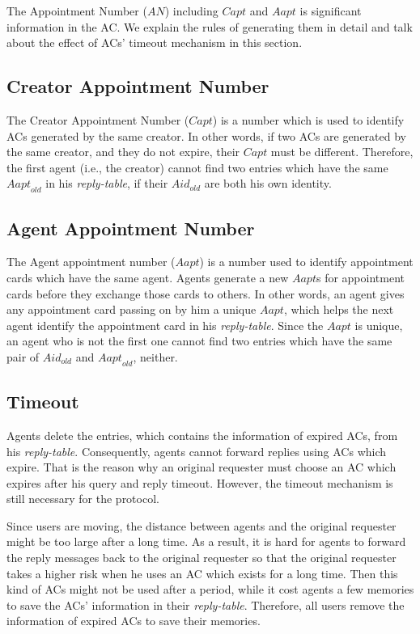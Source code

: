\documentclass[conference]{IEEEtran}
\begin{document}
\noindent The Appointment Number ($AN$) including $Capt$ and $Aapt$ is significant information in the AC. We explain the rules of generating them in detail and talk about the effect of ACs' timeout mechanism in this section.


\subsection{  Creator Appointment Number}

\noindent The Creator Appointment Number ($Capt$) is a number which is used to identify ACs generated by the same creator. In other words, if two ACs are generated by the same creator, and they do not expire, their $Capt$ must be different. Therefore, the first agent (i.e., the creator) cannot find two entries which have the same ${Aapt}_{old}$ in his \textit{reply-table}, if their ${Aid}_{old}$ are both his own identity.


\subsection{ Agent Appointment Number}

\noindent The Agent appointment number ($Aapt$) is a number used to identify appointment cards which have the same agent. Agents generate a new $Aapt$s for appointment cards before they exchange those cards to others. In other words, an agent gives any appointment card passing on by him a unique $Aapt$, which helps the next agent identify the appointment card in his \textit{reply-table}. Since the $Aapt$ is unique, an agent who is not the first one cannot find two entries which have the same pair of ${Aid}_{old}$ and ${Aapt}_{old}$, neither.


\subsection{ Timeout}

\noindent Agents delete the entries, which contains the information of expired ACs, from his \textit{reply-table}. Consequently, agents cannot forward replies using ACs which expire. That is the reason why an original requester must choose an AC which expires after his query and reply timeout. However, the timeout mechanism is still necessary for the protocol.

Since users are moving, the distance between agents and the original requester might be too large after a long time. As a result, it is hard for agents to forward the reply messages back to the original requester so that the original requester takes a higher risk when he uses an AC which exists for a long time. Then this kind of ACs might not be used after a period, while it cost agents a few memories to save the ACs' information in their \textit{reply-table}. Therefore, all users remove the information of expired ACs to save their memories.
\end{document}
